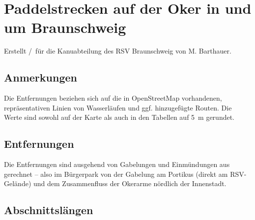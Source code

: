 \documentclass{article}
\begin{document}
    \section*{Paddelstrecken auf der Oker in und um Braunschweig}  
    Erstellt \the\month/\the\year~für die Kanuabteilung des RSV Braunschweig von M. Barthauer.
         
    \subsection*{Anmerkungen} Die Entfernungen beziehen sich auf die in
    OpenStreetMap vorhandenen, repräsentativen Linien von Wasserläufen und ggf.
    hinzugefügte Routen. Die Werte sind sowohl auf der Karte als auch in
    den Tabellen auf 5~m gerundet.
        
    \subsection*{Entfernungen} Die Entfernungen sind ausgehend von Gabelungen und
    Einmündungen aus gerechnet -- also im Bürgerpark von der Gabelung am
    Portikus (direkt am RSV-Gelände) und dem Zusammenfluss der Okerarme nördlich
    der Innenstadt. \\
    \begin{center}
    \end{center}
    
    \subsection*{Abschnittslängen}
    
    \begin{center}
    \end{center}    
   
    \listoffigures
    
\end{document}
